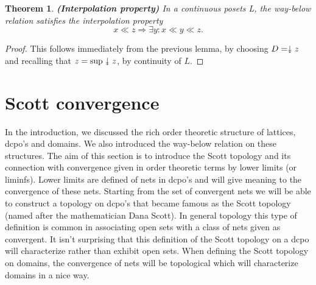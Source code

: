 \documentclass[a4paper,12pt]{article}
\newcommand{\downdownarrow}{\mathrel{\reflectbox{\rotatebox[origin=c]{90}{$\twoheadleftarrow$}}}}
\newtheorem{theorem}{Theorem}[section]
\begin{document}
\begin{theorem}\label{interpolation}\textbf{(Interpolation property)} In a continuous posets L, the way-below relation satisfies the interpolation property $$x \ll z \Rightarrow \exists y: x \ll y \ll z.$$
\end{theorem}
\begin{proof}
This follows immediately from the previous lemma, by choosing $D = \downdownarrow z$ and recalling that $z = \sup \downdownarrow z$, by continuity of $L$.
\end{proof}

\section{Scott convergence}
In the introduction, we discussed the rich order theoretic structure of lattices, dcpo's and domains. We also introduced the way-below relation on these structures. The aim of this section is to introduce the Scott topology and its connection with convergence given in order theoretic terms by lower limits (or liminfs). Lower limits are defined of nets in dcpo's and will give meaning to the convergence of these nets. Starting from the set of convergent nets we will be able to construct a topology on dcpo's that became famous as the Scott topology  (named after the mathematician Dana Scott). In general topology this type of definition is common in associating open sets with a class of nets given as convergent. It isn't surprising that this definition of the Scott topology on a dcpo will characterize rather than exhibit open sets. When defining the Scott topology on domains, the convergence of nets will be topological which will characterize domains in a nice way.
\end{document}
